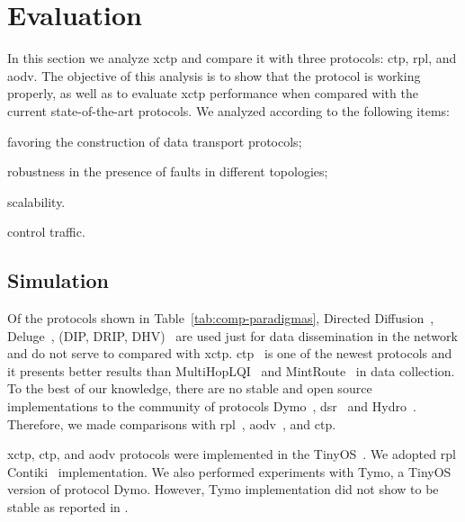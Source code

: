 \section{Evaluation}
\label{sec:evaluation}



In this section we analyze \ac{xctp} and compare it with three protocols:
\ac{ctp}, \ac{rpl}, and \ac{aodv}. The objective of this analysis is to show that the
protocol is working properly, as well as to evaluate \ac{xctp} performance when
compared with the current state-of-the-art protocols. We analyzed according to
the following items:
\begin{inparaenum}
    \item favoring the construction of data transport protocols;
    \item robustness in the presence of faults in different topologies;
    \item scalability.
    \item control traffic.
\end{inparaenum}

\subsection{Simulation}
\label{sec:simulation}

Of the protocols shown in Table~\ref{tab:comp-paradigmas}, Directed Diffusion~\cite{directedDiffusion},
Deluge~\cite{deluge}, (DIP, DRIP, DHV)~\cite{tinyos} are used just for data
dissemination in the network and do not serve to compared with \ac{xctp}.
\acf{ctp}~\cite{ctp} is one of the newest protocols and it presents better
results than MultiHopLQI~\cite{MultiHopLQI} and MintRoute~\cite{mintroute} in
data collection. To the best of our knowledge, there are no stable and open
source implementations to the community of protocols Dymo~\cite{dymo}, \ac{dsr}~\cite{DSR} and Hydro~\cite{hydro}. Therefore, we made comparisons with \ac{rpl}~\cite{RPL}, \ac{aodv}~\cite{AODV}, and \ac{ctp}.

\ac{xctp}, \ac{ctp}, and \ac{aodv} protocols were implemented in the
TinyOS~\cite{tinyos}. We adopted \ac{rpl} Contiki~\cite{contiki} implementation. We also performed experiments with Tymo, a
 TinyOS version of protocol Dymo. However, Tymo implementation did not
show to be stable as reported in \cite{tymo}.


